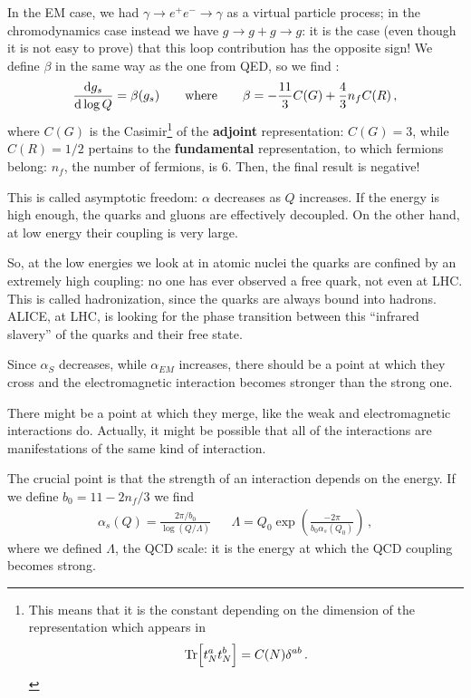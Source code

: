 \documentclass[main.tex]{subfiles}
\begin{document}
In the EM case, we had \(\gamma \to e^{+} e^{-} \to \gamma \) as a virtual particle process; in the chromodynamics case instead we have \(g \to g + g \to g \): it is the case (even though it is not easy to prove) that this loop contribution has the opposite sign! We define \(\beta \) in the same way as the one from QED, so we find \cite[eq.\ 11.65]{peskinConceptsElementaryParticle2019}:
%
\begin{align}
\dv{g_{s}}{\log Q} = \beta (g_s) 
\qquad \text{where} \qquad
\beta = - \frac{11}{3} C(G) +  \frac{4}{3} n_f C(R) 
\,,
\end{align}
%
where \(C(G)\) is the Casimir\footnote{This means that it is the constant depending on the dimension of the representation which appears in 
%
\begin{align}
\Tr[t^{a}_{N} t^{b}_{N}] = C(N) \delta^{ab}
\,.
\end{align}} of the \textbf{adjoint} representation: \(C(G) = 3\), while \(C(R) = 1/2\) pertains to the \textbf{fundamental} representation, to which fermions belong: \(n_f\), the number of fermions, is 6. Then, the final result is negative! 

This is called asymptotic freedom: \(\alpha \) decreases as \(Q\) increases.
If the energy is high enough, the quarks and gluons are effectively decoupled.
On the other hand, at low energy their coupling is very large.

So, at the low energies we look at in atomic nuclei the quarks are confined by an extremely high coupling: no one has ever observed a free quark, not even at LHC. 
This is called hadronization, since the quarks are always bound into hadrons.
ALICE, at LHC, is looking for the phase transition between this ``infrared slavery'' of the quarks and their free state. 

Since \(\alpha_{S}\) decreases, while \(\alpha_{EM}\) increases, there should be a point at which they cross and the electromagnetic interaction becomes stronger than the strong one. 

There might be a point at which they merge, like the weak and electromagnetic interactions do. 
Actually, it might be possible that all of the interactions are manifestations of the same kind of interaction. 

The crucial point is that the strength of an interaction depends on the energy. If we define \(b_0 = 11 - 2 n_f / 3\) we find 
%
\begin{align}
\alpha_s (Q) = \frac{ 2 \pi / b_0 }{\log(Q / \Lambda )}
&&
\Lambda = Q_0 \exp(\frac{-2 \pi }{b_0 \alpha_{s}(Q_0 )})
\,,
\end{align}
%
where we defined \(\Lambda \), the QCD scale: it is the energy at which the QCD coupling becomes strong.
\end{document}

